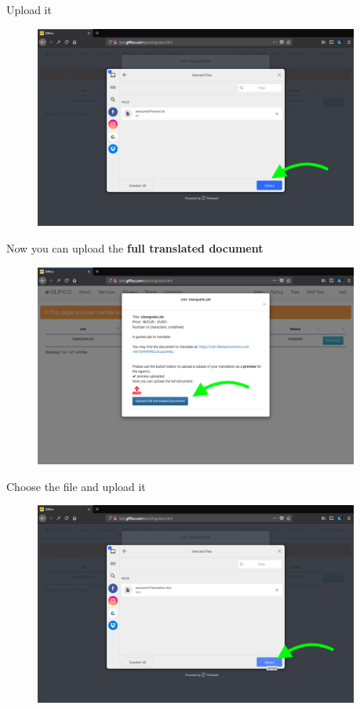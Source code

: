 \documentclass[11 pt, a4paper]{article}
\begin{document}
Upload it
\begin{figure}[H]
\centering
\includegraphics[width=0.95\textwidth]{translator_job7.png}
\end{figure}


\clearpage
Now you can upload the \textbf{full translated document}
\begin{figure}[H]
\centering
\includegraphics[width=0.95\textwidth]{translator_job8.png}
\end{figure}

Choose the file and upload it
\begin{figure}[H]
\centering
\includegraphics[width=0.95\textwidth]{translator_job9.png}
\end{figure}
\end{document}
